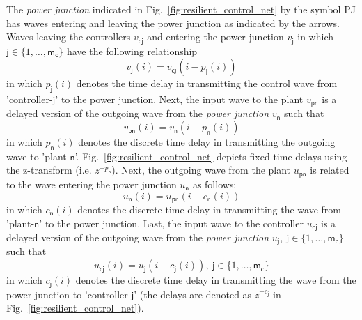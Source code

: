  The {\em power junction} indicated in Fig.~\ref{fig:resilient_control_net} by
  the symbol \textsf{PJ} has waves entering and leaving the power
  junction as indicated by the arrows.  Waves leaving the controllers $v_{\mathsf{cj}}$
  and entering the power junction $v_{\mathsf{j}}$ in which
  $\mathsf{j} \in \{1,\dots,\mathsf{m_c}\}$ have the following
  relationship
\begin{equation*}
v_{\mathsf{j}}(i) = v_{\mathsf{cj}}(i-p_{\mathsf{j}}(i))
\end{equation*}
in which $p_{\mathsf{j}}(i)$ denotes the time delay in transmitting the
control wave from 'controller-$\mathsf{j}$' to the power junction.
Next, the input wave to the plant $v_{\mathsf{pn}}$ is a delayed version of the
  outgoing wave from the {\em power junction} $v_{\mathsf{n}}$ such that 
\begin{equation*}
v_{\mathsf{pn}}(i) = v_{\mathsf{n}}(i-p_{\mathsf{n}}(i))
\end{equation*}
in which $p_{\mathsf{n}}(i)$ denotes the discrete time delay in
transmitting the outgoing wave to 'plant-$\mathsf{n}$'.
Fig.~\ref{fig:resilient_control_net} depicts fixed time
delays using the z-transform (i.e. $z^{-p_{\mathsf{n}}}$).  Next, the outgoing wave from
the plant $u_{\mathsf{pn}}$ is related to the wave entering the power junction
$u_{\mathsf{n}}$ as follows:
\begin{equation*}
u_{\mathsf{n}}(i) = u_{\mathsf{pn}}(i-c_{\mathsf{n}}(i))
\end{equation*}
in which $c_{\mathsf{n}}(i)$ denotes the discrete time delay in
transmitting the wave from 'plant-$\mathsf{n}$' to the power junction.  Last, the input
wave to the controller $u_{\mathsf{cj}}$ is a delayed version of the outgoing
wave from the {\em power junction} $u_{\mathsf{j}},\ \mathsf{j} \in \{1,\dots,\mathsf{m_c}\}$ such
that 
\begin{equation*}
u_{\mathsf{cj}}(i) = u_{\mathsf{j}}(i-c_{\mathsf{j}}(i)),\ \mathsf{j} \in \{1,\dots,\mathsf{m_c}\}
\end{equation*}
in which $c_{\mathsf{j}}(i)$ denotes the discrete time delay in
transmitting the wave from the power junction to
'controller-$\mathsf{j}$' (the delays are denoted as
$z^{-c_{\mathsf{j}}}$ in Fig.~\ref{fig:resilient_control_net}).
